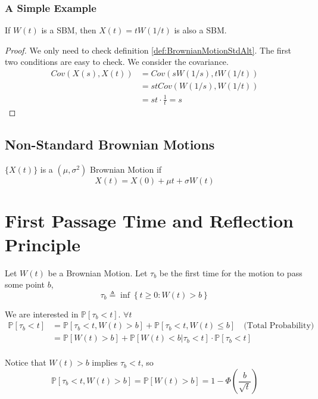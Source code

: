         \subsubsection{A Simple Example}
            If $W(t)$ is a SBM, then $X(t)=tW(1/t)$ is also a SBM.
            \begin{proof}
                We only need to check definition \ref{def:BrownianMotionStdAlt}. The first two conditions are easy to check. We consider the covariance.
                \begin{align*}
                    Cov(X(s), X(t)) &= Cov(sW(1/s),tW(1/t))\\
                    &= stCov(W(1/s), W(1/t))\\
                    &= st\cdot\frac{1}{t} = s
                \end{align*}
            \end{proof}

    \subsection{Non-Standard Brownian Motions}
        \begin{definition}
            $\{X(t)\}$ is a $(\mu, \sigma^2)$ Brownian Motion if
            \[ X(t) = X(0) + \mu t + \sigma W(t) \]
        \end{definition}


\section{First Passage Time and Reflection Principle}
    Let $W(t)$ be a Brownian Motion. Let $\tau_b$ be the first time for the motion to pass some point $b$,
    \[ \tau_b \triangleq \inf\left\{ t \ge 0 : W(t) > b \right\} \]

    We are interested in $\mathbb{P}[\tau_b < t]$. $\forall t$
    \begin{align*}
        \mathbb{P}[\tau_b < t] &= \mathbb{P}[\tau_b < t, W(t) > b] + \mathbb{P}[\tau_b < t, W(t) \le b] \quad \text{(Total Probability)}\\
        &= \mathbb{P}[W(t) > b] + \mathbb{P}[W(t) < b | \tau_b < t]\cdot\mathbb{P}[\tau_b < t]\\
    \end{align*}

    Notice that $W(t) > b$ implies $\tau_b < t$, so
    \[ \mathbb{P}[\tau_b < t, W(t) > b] = \mathbb{P}[W(t) > b] = 1 - \Phi(\frac{b}{\sqrt{t}}) \]

